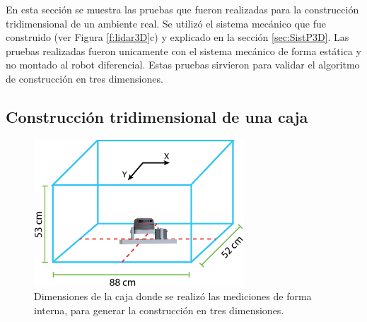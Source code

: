 En esta sección se muestra las pruebas que fueron realizadas para la construcción
tridimensional de un ambiente real. Se utilizó el sistema mecánico que fue construido 
(ver Figura \ref{f:lidar3D}c) y explicado en la sección \ref{sec:SistP3D}. Las pruebas 
realizadas fueron unicamente con el sistema mecánico de forma estática y no montado al robot 
diferencial. Estas pruebas sirvieron para validar el algoritmo de construcción 
en tres dimensiones.


\subsection{Construcción tridimensional de una caja}
\label{sec:MapaCaja}
\begin{figure}
  \centering \footnotesize
  \includegraphics[width=0.70\textwidth]{images/3DLidar.eps}
  \captionsetup{font=footnotesize}
  \caption{Dimensiones de la caja donde se realizó las mediciones de forma interna, para
  generar la construcción en tres dimensiones.}
  \label{fig:dim_cajaReal}
\end{figure}


